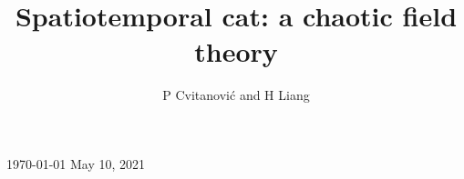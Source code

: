 \documentclass[12pt]{iopart}
\begin{document}
\title[Spatiotemporal cat]
{Spatiotemporal cat: a chaotic field theory} %

    \author{
P Cvitanovi{\'c}
         and
H Liang
    }\address{
Center for Nonlinear Science, School of Physics,
            Georgia Institute of Technology,
            Atlanta, GA 30332-0430, USA
    } 
    \vspace{10pt}
    \begin{indented}
    \item[]
    \ifboyscout\today\else
May 10, 2021  %
    \fi
    \end{indented}

    \begin{abstract}

    \end{abstract}



\submitto{\NL}
    \ifsubmission
\maketitle %
    \fi

\renewcommand{\statesp}{phase space}
\renewcommand{\Statesp}{Phase space}
\renewcommand{\stateDsp}{phase-space}
\renewcommand{\StateDsp}{Phase-space}


    \ifboyscout\clearpage\fi

    \ifboyscout\clearpage\fi


\renewcommand{\statesp}{state space}
\renewcommand{\Statesp}{State space}
\renewcommand{\stateDsp}{state-space}
\renewcommand{\StateDsp}{State-space}

    \ifboyscout\clearpage\fi

    \ifboyscout\clearpage\fi

    \ifboyscout\clearpage\fi

    \ifboyscout\clearpage\fi

\end{document}

